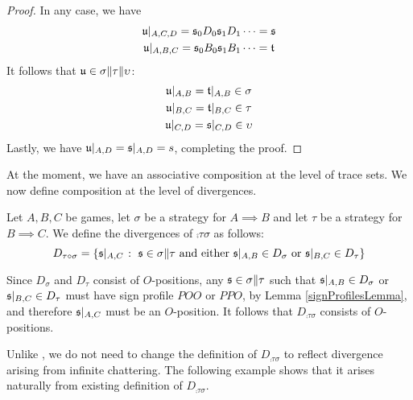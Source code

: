 \documentclass{article}
\begin{document}
\begin{proposition}
\begin{proof}
    In any case, we have
    \begin{gather*}
      \mathfrak u\vert_{A,C,D} = \mathfrak s_0D_0\mathfrak s_1D_1\dots = \mathfrak s \\
      \mathfrak u\vert_{A,B,C} = \mathfrak s_0B_0\mathfrak s_1B_1\dots = \mathfrak t
    \end{gather*}
    It follows that $\mathfrak u\in\sigma\|\tau\|\upsilon$: 
    \begin{gather*}
      \mathfrak u\vert_{A,B} = \mathfrak t\vert_{A,B} \in \sigma \\
      \mathfrak u\vert_{B,C} = \mathfrak t\vert_{B,C} \in \tau \\
      \mathfrak u\vert_{C,D} = \mathfrak s\vert_{C,D} \in \upsilon
    \end{gather*}
    Lastly, we have $\mathfrak u\vert_{A,D} = \mathfrak s\vert_{A,D} = s$, completing the proof.
  \end{proof}
\end{proposition}

At the moment, we have an associative composition at the level of trace sets.  We now define composition at the level of divergences.

\begin{definition}
  Let $A,B,C$ be games, let $\sigma$ be a strategy for $A\implies B$ and let $\tau$ be a strategy for $B\implies C$.  We define the divergences of $\comp\tau\sigma$ as follows:
  \[
    D_{\tau \circ \sigma} = \{\mathfrak s\vert_{A,C}\;\colon\;\mathfrak s\in\sigma\|\tau\textrm{ and either $\mathfrak s\vert_{A,B}\in D_\sigma$ or $\mathfrak s\vert_{B,C}\in D_\tau$}\}
    \]
\end{definition}

\begin{remark}
  Since $D_\sigma$ and $D_\tau$ consist of $O$-positions, any $\mathfrak s\in\sigma\|\tau$ such that $\mathfrak s\vert_{A,B}\in D_\sigma$ or $\mathfrak s\vert_{B,C}\in D_\tau$ must have sign profile $POO$ or $PPO$, by Lemma \ref{signProfilesLemma}, and therefore $\mathfrak s\vert_{A,C}$ must be an $O$-position.  It follows that $D_{\comp\tau\sigma}$ consists of $O$-positions.
\end{remark}

Unlike \cite{mcCHFiniteND}, we do not need to change the definition of $D_{\comp\tau\sigma}$ to reflect divergence arising from infinite chattering.  The following example shows that it arises naturally from existing definition of $D_{\comp\tau\sigma}$.
\end{document}
